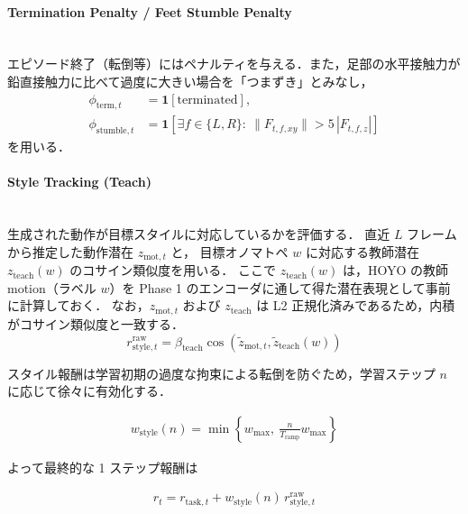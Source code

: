 \paragraph{Termination Penalty / Feet Stumble Penalty}\quad\\

エピソード終了（転倒等）にはペナルティを与える．また，足部の水平接触力が鉛直接触力に比べて過度に大きい場合を「つまずき」とみなし，
\begin{align}
  \phi_{\mathrm{term},t} &= \mathbf{1}[\mathrm{terminated}], \\
  \phi_{\mathrm{stumble},t} &= \mathbf{1}\!\left[\exists f\in\{L,R\}:\ \|F_{t,f,xy}\| > 5\,|F_{t,f,z}|\right]
  \label{eq:task_term_stumble}
\end{align}
を用いる．

\paragraph{Style Tracking (Teach)}\quad\\

生成された動作が目標スタイルに対応しているかを評価する．
直近 $L$ フレームから推定した動作潜在 $z_{\mathrm{mot},t}$ と，
目標オノマトペ $w$ に対応する教師潜在 $z_{\mathrm{teach}}(w)$ のコサイン類似度を用いる．
ここで $z_{\mathrm{teach}}(w)$ は，HOYO の教師 motion（ラベル $w$）を Phase 1 のエンコーダに通して得た潜在表現として事前に計算しておく．
なお，$z_{\mathrm{mot},t}$ および $z_{\mathrm{teach}}$ は L2 正規化済みであるため，内積がコサイン類似度と一致する．
\begin{equation}
  r_{\mathrm{style}, t}^{\mathrm{raw}}
  = \beta_{\mathrm{teach}}\cos(\tilde{z}_{\mathrm{mot}, t}, \tilde{z}_{\mathrm{teach}}(w))
  \label{eq:rl_style_raw}
\end{equation}

スタイル報酬は学習初期の過度な拘束による転倒を防ぐため，学習ステップ $n$ に応じて徐々に有効化する．

\begin{align}
  w_{\mathrm{style}}(n)=\min\!\left\{w_{\max},\ \frac{n}{T_{\mathrm{ramp}}}w_{\max}\right\}
  \label{eq:rl_style_ramp}
\end{align}

よって最終的な 1 ステップ報酬は

\begin{align}
  r_t = r_{\mathrm{task},t} + w_{\mathrm{style}}(n)\, r_{\mathrm{style}, t}^{\mathrm{raw}}
  \label{eq:rl_total_reward}
\end{align}

